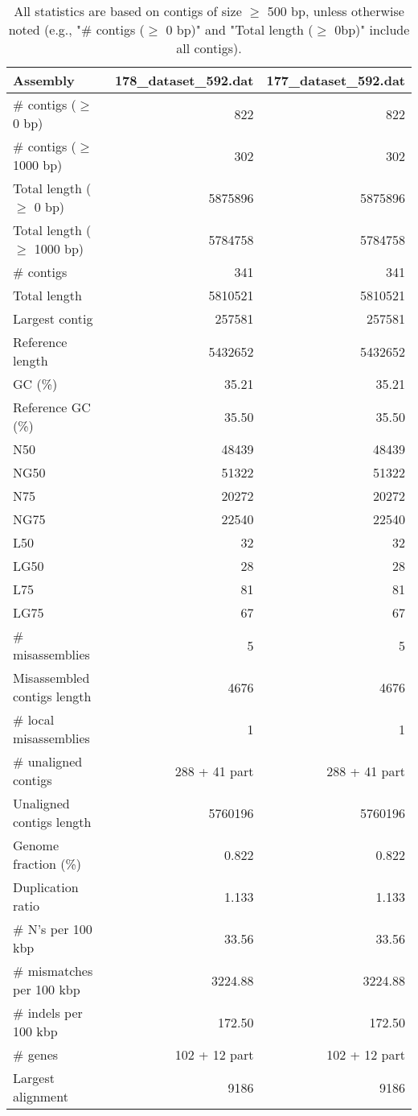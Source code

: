\documentclass[12pt,a4paper]{article}
\begin{document}
\begin{table}[ht]
\begin{center}
\caption{All statistics are based on contigs of size $\geq$ 500 bp, unless otherwise noted (e.g., "\# contigs ($\geq$ 0 bp)" and "Total length ($\geq$ 0bp)" include all contigs).}
\begin{tabular}{|l*{2}{|r}|}
\hline
Assembly & 178\_dataset\_592.dat & 177\_dataset\_592.dat \\ \hline
\# contigs ($\geq$ 0 bp) & 822 & 822 \\ \hline
\# contigs ($\geq$ 1000 bp) & 302 & 302 \\ \hline
Total length ($\geq$ 0 bp) & 5875896 & 5875896 \\ \hline
Total length ($\geq$ 1000 bp) & 5784758 & 5784758 \\ \hline
\# contigs & 341 & 341 \\ \hline
Total length & 5810521 & 5810521 \\ \hline
Largest contig & 257581 & 257581 \\ \hline
Reference length & 5432652 & 5432652 \\ \hline
GC (\%) & 35.21 & 35.21 \\ \hline
Reference GC (\%) & 35.50 & 35.50 \\ \hline
N50 & 48439 & 48439 \\ \hline
NG50 & 51322 & 51322 \\ \hline
N75 & 20272 & 20272 \\ \hline
NG75 & 22540 & 22540 \\ \hline
L50 & 32 & 32 \\ \hline
LG50 & 28 & 28 \\ \hline
L75 & 81 & 81 \\ \hline
LG75 & 67 & 67 \\ \hline
\# misassemblies & 5 & 5 \\ \hline
Misassembled contigs length & 4676 & 4676 \\ \hline
\# local misassemblies & 1 & 1 \\ \hline
\# unaligned contigs & 288 + 41 part & 288 + 41 part \\ \hline
Unaligned contigs length & 5760196 & 5760196 \\ \hline
Genome fraction (\%) & 0.822 & 0.822 \\ \hline
Duplication ratio & 1.133 & 1.133 \\ \hline
\# N's per 100 kbp & 33.56 & 33.56 \\ \hline
\# mismatches per 100 kbp & 3224.88 & 3224.88 \\ \hline
\# indels per 100 kbp & 172.50 & 172.50 \\ \hline
\# genes & 102 + 12 part & 102 + 12 part \\ \hline
Largest alignment & 9186 & 9186 \\ \hline
\end{tabular}
\end{center}
\end{table}
\end{document}
